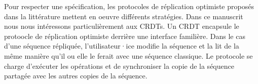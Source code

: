 
Pour respecter une spécification, les protocoles de réplication optimiste proposés dans la littérature mettent en oeuvre différents stratégies.
Dans ce manuscrit nous nous intéressons particulièrement aux \acp{CRDT}.
Un \ac{CRDT} encapsule le protoocle de réplication optimiste derrière une interface familière.
Dans le cas d'une séquence répliquée, l'utilisateur·ice modifie la séquence et la lit de la même manière qu'il ou elle le ferait avec une séquence classique.
Le protocole se charge d'exécuter les opérations et de synchroniser la copie de la séquence partagée avec les autres copies de la séquence.


